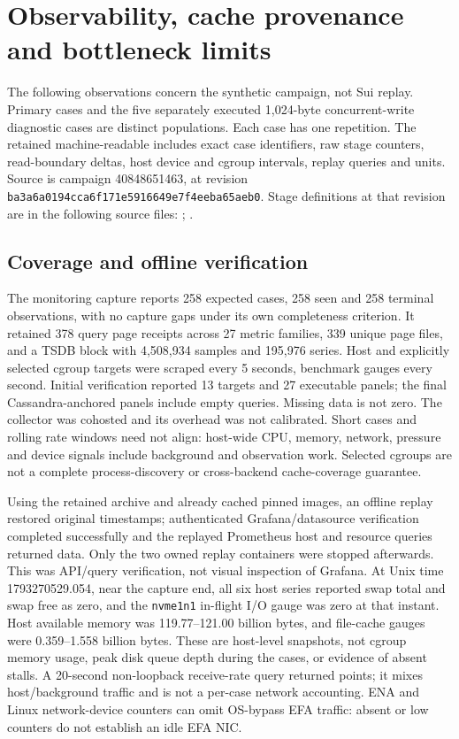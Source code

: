\section{Observability, cache provenance and bottleneck limits}\label{obs-observability}
The following observations concern the synthetic campaign, not Sui replay. Primary cases and the five separately executed 1,024-byte concurrent-write diagnostic cases are distinct populations. Each case has one repetition. The retained machine-readable  includes exact case identifiers, raw stage counters, read-boundary deltas, host device and cgroup intervals, replay queries and units. Source is campaign 40848651463, at revision \texttt{ba3a6a0194cca6f171e5}\allowbreak\texttt{916649e7f4eeba65aeb0}. Stage definitions at that revision are in the following source files: ; .

\subsection{Coverage and offline verification}\label{obs-coverage}
The monitoring capture reports 258 expected cases, 258 seen and 258 terminal observations, with no capture gaps under its own completeness criterion. It retained 378 query page receipts across 27 metric families, 339 unique page files, and a TSDB block with 4,508,934 samples and 195,976 series. Host and explicitly selected cgroup targets were scraped every 5 seconds, benchmark gauges every second. Initial verification reported 13 targets and 27 executable panels; the final Cassandra-anchored panels include empty queries. Missing data is not zero. The collector was cohosted and its overhead was not calibrated. Short cases and rolling rate windows need not align: host-wide CPU, memory, network, pressure and device signals include background and observation work. Selected cgroups are not a complete process-discovery or cross-backend cache-coverage guarantee.

Using the retained archive and already cached pinned images, an offline replay restored original timestamps; authenticated Grafana/datasource verification completed successfully and the replayed Prometheus host and resource queries returned data. Only the two owned replay containers were stopped afterwards. This was API/query verification, not visual inspection of Grafana. At Unix time 1793270529.054, near the capture end, all six host series reported swap total and swap free as zero, and the \texttt{nvme1n1} in-flight I/O gauge was zero at that instant. Host available memory was 119.77--121.00 billion bytes, and file-cache gauges were 0.359--1.558 billion bytes. These are host-level snapshots, not cgroup memory usage, peak disk queue depth during the cases, or evidence of absent stalls. A 20-second non-loopback receive-rate query returned points; it mixes host/background traffic and is not a per-case network accounting. ENA and Linux network-device counters can omit OS-bypass EFA traffic: absent or low counters do not establish an idle EFA NIC.

